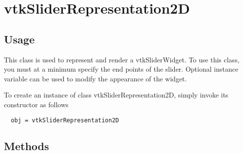 \section{vtkSliderRepresentation2D}

\subsection{Usage}

 This class is used to represent and render a vtkSliderWidget. To use this
 class, you must at a minimum specify the end points of the
 slider. Optional instance variable can be used to modify the appearance of
 the widget.


To create an instance of class vtkSliderRepresentation2D, simply
invoke its constructor as follows
\begin{verbatim}
  obj = vtkSliderRepresentation2D
\end{verbatim}
\subsection{Methods}

